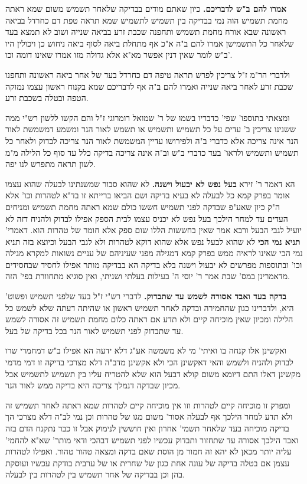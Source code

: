 \documentclass[12pt, openany]{book}
\newcommand{\sethebfont}{
\fontsize{10.5pt}{21.0pt} \selectfont
}
\newcommand{\twocol}[1]{
	{\sethebfont \begin{multicols}{2}
			#1
	\end{multicols}}	
}
\begin{document}
{ \textbf{אמרו להם ב"ש לדבריכם.}  כיון שאתם מודים בבדיקה שלאחר תשמיש משום שמא ראתה מחמת תשמיש הוה נמי בבדיקה בין תשמיש לתשמיש שמא תראה טפת דם כחרדל בביאה ראשונה שבא אורח מחמת תשמיש ותחפנה שכבת זרע בביאה שנייה ושוב לא תמצא בעד שלאחר כל התשמישן אמרו להם ב"ה א"כ אף מתחלת ביאה לסוף ביאה ניחוש כן ויכולין היו ב"ש לומר שאין דנין אפשר מא"א אלא גדולה מזו אמרו שאינו דומה וכו'.\par ולדברי הר"מ ז"ל צריכין לפרש תראה טיפה דם כחרדל בעד של אחר ביאה ראשונה ותחפנו שכבת זרע לאחר ביאה שנייה ואמרו להם ב"ה אף לדבריכם שמא בקנוח ראשון עצמו נמוקה הטפה ובטלה בשכבת זרע.\par  ומצאתי בתוספו' שפי' כדבריו בשמו של ר' שמואל רומרוגי ז"ל והם הקשו ללשון רש"י ממה ששנינו צריכין ב' עדים על כל תשמיש ותשמיש או תשמש לאור הנר ומשמע דמשמשת לאור הנר אינה צריכה אלא כדברי ב"ה ולפירושו עדיין המשמשת לאור הנר צריכה לבדוק ולאחר כל תשמיש ותשמיש ולראו' בעד כדברי ב"ש וב"ה אינה צריכה בדיקה כלל עד סוף כל הלילה מ"מ לשון תראה מתפרש לנו יפה. 
\par}
\twocol{הא דאמר ר' זירא \textbf{בעל נפש לא יבעול וישנה.}  לא שהוא סבור שמשנתינו לבעלה שהוא עצמו אומר בפרק קמא כל לבעלה לא בעיא בדיקה ושם הביאו ברייתא זו בד"א לטהרות וכו' אלא ה"ק כיון שאע"פ שבדקה לפני תשמיש חששו כולם שמא ראתה מחמת תשמיש ומניחים העדים עד למחר הילכך בעל נפש לא יכניס עצמו לבית הספק אפילו לבדוק ולהניח דזה לא יועיל לגבי הבעל ורבא אמר שאין בחששות הללו שום ספק אלא חומר של טהרות הוא. 
\parוהא דאמרי' \textbf{תניא נמי הכי}  לא שהוא לבעל נפש אלא שהוא דוקא לטהרות ולא לגבי הבעל וכיוצא בזה תניא נמי הכי שאינו לראיה ממש בפרק קמא דמגילה מפני שעיניהם של עניים נשואות למקרא מגילה וכו' ובתוספות מפרשים לא יבעול וישנה בלא בדיקה הא בבדיקה מותר אפילו לחסיד שבחסידים מדאמרינן במס' שבת אמר ר' יוסי ה' בעילות בעלתי ושניתי, ואין סוגיא מתחוורת בפי' הזה. 
\par\textbf{בדקה בעד ואבד אסורה לשמש עד שתבדוק.}  לדברי רש"י ז"ל בעד שלפני תשמיש ופשוט' היא, ולדברינו כגון שהחמירה ובדקה לאחר תשמיש ראשון או שהיתה דעתה שלא לשמש כל הלילה ומכיון שאין מוכיחה קיים ולא תדע אם ראתה כלום מחמת תשמיש זה אסורה לשמש עד שתבדוק לפני תשמיש לאור הנר בכל בדיקה של בעל.\par  ואקשינן אלו קנחה בו ואיתי' מי לא משמשה אע"ג דלא ידעה הא אפילו ב"ש דמחמרי שרו לבדוק ולהניח ולשמש והאי דאקשינן הכי ולא אקשינן מדב"ה דלא מצרכי בדיקה זו דמי מדמי מקשינן דאלו התם דיומא משום קולא דבעל הוא שלא להטריח עליו בין תשמיש לתשמיש אבל מכיון שבדקה דנמלך צריכה היא בדיקה ממש לאור הנר.\par  ומפרק זו מוכיחה קיים לטהרות וזו אין מוכיחה קיים לטהרות שמא ראתה לאחר תשמיש זה ולא תדע למחר הילכך אף לבעלה אסור' משום מגו של טהרות וכן נמי לב"ה דלא מצרכי הך בדיקה מוכיחה בעד שלאחר תשמי' אחרון ואין חוששין לנימוק אבל זו כבר נתקנח הדם בזה ואבד הילכך אסורה עד שתחזור ותבדוק עכשיו לפני תשמיש דבהכי ודאי מותר' שא"א להחמי' עליה יותר מכאן לא יהא זה חמור מן הוסת שאם בדקה ומצאה טהור טהור. ואפילו לטהרות עצמן אם בטלה בדיקה של עונה אחת כגון של שחרית או של ערבית בודקת עכשיו ועוסקת בהן וכן בבדיקה של אחר תשמיש בין לטהרות בין לבעלה. 
\par}
\end{document}
